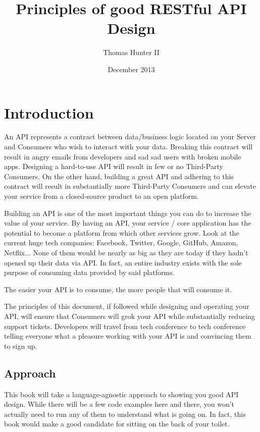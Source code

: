 \documentclass{book}
\title{Principles of good RESTful API Design}
\author{Thomas Hunter II}
\date{December 2013}
\begin{document}
\maketitle

\tableofcontents

\newpage

\chapter{Introduction}

An API represents a contract between data/business logic located on your Server and Consumers who wish to interact with your data. Breaking this contract will result in angry emails from developers and sad sad users with broken mobile apps. Designing a hard-to-use API will result in few or no Third-Party Consumers. On the other hand, building a great API and adhering to this contract will result in substantially more Third-Party Consumers and can elevate your service from a closed-source product to an open platform.

Building an API is one of the most important things you can do to increase the value of your service. By having an API, your service / core application has the potential to become a platform from which other services grow. Look at the current huge tech companies: Facebook, Twitter, Google, GitHub, Amazon, Netflix... None of them would be nearly as big as they are today if they hadn't opened up their data via API. In fact, an entire industry exists with the sole purpose of consuming data provided by said platforms.

The easier your API is to consume, the more people that will consume it.

The principles of this document, if followed while designing and operating your API, will ensure that Consumers will grok your API while substantially reducing support tickets. Developers will travel from tech conference to tech conference telling everyone what a pleasure working with your API is and convincing them to sign up.

\section{Approach}

This book will take a language-agnostic approach to showing you good API design. While there will be a few code examples here and there, you won't actually need to run any of them to understand what is going on. In fact, this book would make a good candidate for sitting on the back of your toilet.
\end{document}
